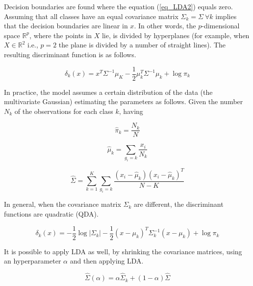 Decision boundaries are found where the equation (\ref{eq_LDA2}) equals zero. Assuming that all classes have an equal covariance matrix $\Sigma_k=\Sigma\ \forall k$ implies that the decision boundaries are linear in $x$. In other words, the $p$-dimensional space $\mathbb{R}^p$, where the points in $X$ lie, is divided by hyperplanes (for example, when $X\in \mathbb{R}^2$ i.e., $p=2$ the plane is divided by a number of straight lines). The resulting discriminant function is as follows.

\begin{equation}
    \delta_k\left(x\right)=x^T\Sigma^{-1}\mu_K-\frac{1}{2}\mu_k^T\Sigma^{-1}\mu_k+\log{\pi_k}
    \label{eq_LDA3}
\end{equation}

In practice, the model assumes a certain distribution of the data (the multivariate Gaussian) estimating the parameters as follows. Given the number $N_k$ of the observations for each class $k$, having

\begin{equation}
    {\hat{\pi}}_k=\frac{N_k}{N}
    \label{eq_LDA4}
\end{equation}

\begin{equation}
    {\hat{\mu}}_k=\sum_{g_i=k}\frac{x_i}{N_k}
    \label{eq_LDA5}
\end{equation}

\begin{equation}
    \hat{\Sigma}=\sum_{k=1}^{K}\sum_{g_i=k}\frac{\left(x_i-{\hat{\mu}}_k\right)\left(x_i-{\hat{\mu}}_k\right)^T}{N-K}
    \label{eq_LDA6}
\end{equation}

In general, when the covariance matrix $\Sigma_k$ are different, the discriminant functions are quadratic (QDA).

\begin{equation}
    \delta_k\left(x\right)=-\frac{1}{2}\log{\left|\Sigma_k\right|-\frac{1}{2}}\left(x-\mu_k\right)^T\Sigma_k^{-1}\left(x-\mu_k\right)+\log{\pi_k}
    \label{eq_LDA7}
\end{equation}

It is possible to apply LDA as well, by shrinking the covariance matrices, using an hyperparameter $\alpha$ and then applying LDA.

\begin{equation}
    \hat{\Sigma}\left(\alpha\right)=\alpha{\hat{\Sigma}}_k+\left(1-\alpha\right)\hat{\Sigma}
    \label{eq_LDA8}
\end{equation}


